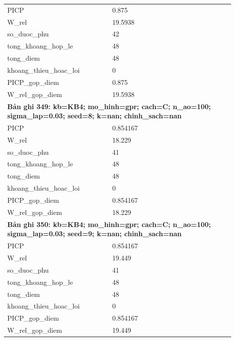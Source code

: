 \begin{longtable}{p{0.43\linewidth}p{0.50\linewidth}}
PICP & 0.875 \\
W\_\allowbreak rel & 19.5938 \\
so\_\allowbreak duoc\_\allowbreak phu & 42 \\
tong\_\allowbreak khoang\_\allowbreak hop\_\allowbreak le & 48 \\
tong\_\allowbreak diem & 48 \\
khoang\_\allowbreak thieu\_\allowbreak hoac\_\allowbreak loi & 0 \\
PICP\_\allowbreak gop\_\allowbreak diem & 0.875 \\
W\_\allowbreak rel\_\allowbreak gop\_\allowbreak diem & 19.5938 \\
\midrule
\multicolumn{2}{p{0.95\linewidth}}{\textbf{Bản ghi 349: kb=KB4; mo\_hinh=gpr; cach=C; n\_ao=100; sigma\_lap=0.03; seed=8; k=nan; chinh\_sach=nan}} \\
PICP & 0.854167 \\
W\_\allowbreak rel & 18.229 \\
so\_\allowbreak duoc\_\allowbreak phu & 41 \\
tong\_\allowbreak khoang\_\allowbreak hop\_\allowbreak le & 48 \\
tong\_\allowbreak diem & 48 \\
khoang\_\allowbreak thieu\_\allowbreak hoac\_\allowbreak loi & 0 \\
PICP\_\allowbreak gop\_\allowbreak diem & 0.854167 \\
W\_\allowbreak rel\_\allowbreak gop\_\allowbreak diem & 18.229 \\
\midrule
\multicolumn{2}{p{0.95\linewidth}}{\textbf{Bản ghi 350: kb=KB4; mo\_hinh=gpr; cach=C; n\_ao=100; sigma\_lap=0.03; seed=9; k=nan; chinh\_sach=nan}} \\
PICP & 0.854167 \\
W\_\allowbreak rel & 19.449 \\
so\_\allowbreak duoc\_\allowbreak phu & 41 \\
tong\_\allowbreak khoang\_\allowbreak hop\_\allowbreak le & 48 \\
tong\_\allowbreak diem & 48 \\
khoang\_\allowbreak thieu\_\allowbreak hoac\_\allowbreak loi & 0 \\
PICP\_\allowbreak gop\_\allowbreak diem & 0.854167 \\
W\_\allowbreak rel\_\allowbreak gop\_\allowbreak diem & 19.449 \\
\midrule
\bottomrule
\end{longtable}
